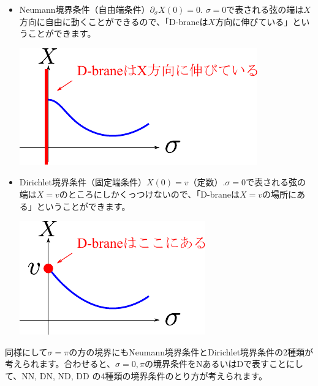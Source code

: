 \documentclass[report,paper=a4, fontsize=12pt, line_length=16cm, number_of_lines=33,dvipdfmx]{jlreq}
\numberwithin{equation}{chapter}
\numberwithin{equation}{section}
\newcommand{\del}{\partial}
\begin{document}
\begin{itemize}
  \item Neumann境界条件（自由端条件）$\del_{\sigma} X(0)=0$. $\sigma=0$で表される弦の端は$X$方向に自由に動くことができるので、「D-braneは$X$方向に伸びている」ということができます。\\
  \begin{center}
    \includegraphics{NBC.pdf}    
  \end{center}
  \item Dirichlet境界条件（固定端条件）$X(0)=v$（定数）.$\sigma=0$で表される弦の端は$X=v$のところにしかくっつけないので、「D-braneは$X=v$の場所にある」ということができます。\\
  \begin{center}
    \includegraphics{DBC.pdf}    
  \end{center}
\end{itemize}
同様にして$\sigma=\pi$の方の境界にもNeumann境界条件とDirichlet境界条件の2種類が考えられます。合わせると、$\sigma=0,\pi$の境界条件をNあるいはDで表すことにして、NN, DN, ND, DD の4種類の境界条件のとり方が考えられます。
\end{document}
